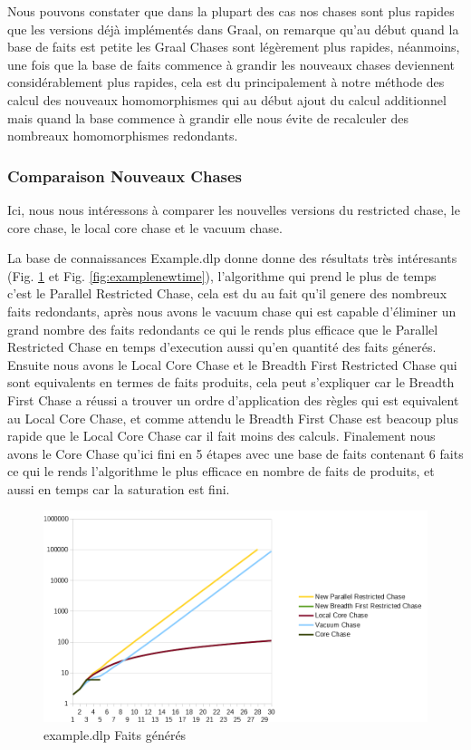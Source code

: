 Nous pouvons constater que dans la plupart des cas  nos chases sont plus rapides que les versions déjà implémentés dans Graal, on remarque qu'au début quand la base de faits est petite les Graal Chases sont légèrement plus rapides, néanmoins, une fois que la base de faits commence à grandir les nouveaux chases deviennent considérablement plus rapides, cela est du principalement à notre méthode des calcul des nouveaux homomorphismes qui au début ajout du calcul additionnel mais quand la base commence à grandir elle nous évite de recalculer des nombreaux homomorphismes redondants.

\subsubsection{Comparaison Nouveaux Chases}

Ici, nous nous intéressons à comparer les nouvelles versions du restricted chase, le core chase, le local core chase et le vacuum chase.

La base de connaissances Example.dlp donne donne des résultats très intéresants (Fig. \ref{fig:examplenewfacts} et  Fig. \ref{fig:examplenewtime}), l'algorithme qui prend le plus de temps c'est le Parallel Restricted Chase, cela est du au fait qu'il genere des nombreux faits redondants, après nous avons le vacuum chase qui est capable d'éliminer un grand nombre des faits redondants ce qui le rends plus efficace que le Parallel Restricted Chase en temps d'execution aussi qu'en quantité des faits génerés. Ensuite nous avons le Local Core Chase et le Breadth First Restricted Chase qui sont equivalents en termes de faits produits, cela peut s'expliquer car le Breadth First Chase a réussi a trouver un ordre d'application des règles qui est equivalent au Local Core Chase, et comme attendu le Breadth First Chase est beacoup plus rapide que le Local Core Chase car il fait moins des calculs. Finalement nous avons le Core Chase qu'ici fini en 5 étapes avec une base de faits contenant 6 faits ce qui le rends l'algorithme le plus efficace en nombre de faits de produits, et aussi en temps car la saturation est fini.

\begin{figure}
\centering
\includegraphics[width=\textwidth]{pictures/benchmark new/examplenewfacts.png}
\caption{example.dlp Faits générés}
\label{fig:examplenewfacts}
\end{figure}

